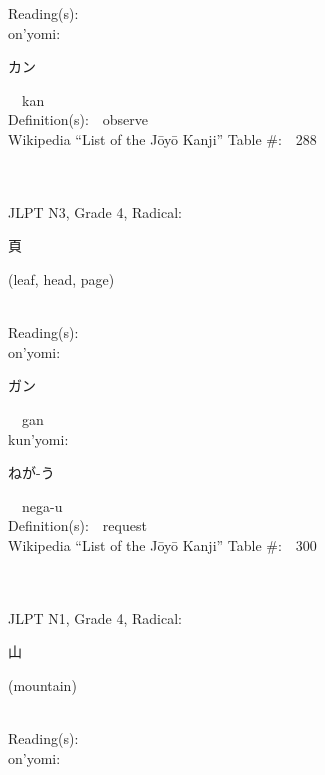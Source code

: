 \begin{multicols}{2}
Reading(s):\ \ \\
{\hspace*{1em}}on'yomi:\ \ \\
{\hspace*{2em}}{\begin{CJK}{UTF8}{min} カン \end{CJK}}\ \ kan\ \ \\
Definition(s):\ \ observe \\
Wikipedia ``List of the J\=oy\=o Kanji'' Table \#:\ \ 288 \\
\ \ \\
{\fontsize{34pt}{40pt}  }\ \ \\  %
{JLPT N3, Grade 4, Radical:\ \ {\begin{CJK}{UTF8}{min} 頁 \end{CJK}} (leaf, head, page) } \\
Reading(s):\ \ \\
{\hspace*{1em}}on'yomi:\ \ \\
{\hspace*{2em}}{\begin{CJK}{UTF8}{min} ガン \end{CJK}}\ \ gan\ \ \\
{\hspace*{1em}}kun'yomi:\ \ \\
{\hspace*{2em}}{\begin{CJK}{UTF8}{min} ねが-う \end{CJK}}\ \ nega-u\ \ \\
Definition(s):\ \ request \\
Wikipedia ``List of the J\=oy\=o Kanji'' Table \#:\ \ 300 \\
\ \ \\
{\fontsize{34pt}{40pt}  }\ \ \\  %
{JLPT N1, Grade 4, Radical:\ \ {\begin{CJK}{UTF8}{min} 山 \end{CJK}} (mountain) } \\
Reading(s):\ \ \\
{\hspace*{1em}}on'yomi:\ \ \\

\end{multicols}
